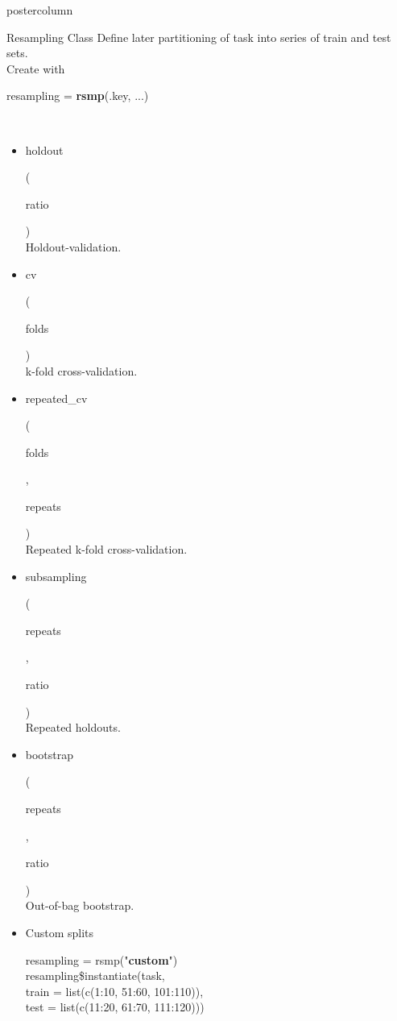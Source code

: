 \documentclass{beamer}
\newlength{\columnheight} %
\newcommand{\codeinline}[1]{\begin{codeboxinline}#1\end{codeboxinline}}
\begin{document}
\begin{withoutheader}
\begin{frame}[fragile]{}
	\begin{columns}
		\begin{column}{.245\textwidth}
			\begin{beamercolorbox}[center]{postercolumn}
				\begin{minipage}{.98\textwidth}
					\parbox[t][\columnheight]{\textwidth}{
							\begin{myblock}{Resampling Class}
							Define later partitioning of task into series of train and test sets. \\ 
							Create with \codeinline{resampling = \textbf{rsmp}(.key, ...)}
							\\
							\begin{itemize}
                                \item \codeinline{holdout}
                                (\codeinline{ratio})\\
                                Holdout-validation.
								\item \codeinline{cv}
								(\codeinline{folds})\\
								k-fold cross-validation.
								\item \codeinline{repeated\_cv}
								(\codeinline{folds}, \codeinline{repeats})\\
								Repeated k-fold cross-validation.
								\item \codeinline{subsampling}
								(\codeinline{repeats}, \codeinline{ratio})\\
								Repeated holdouts.
								\item \codeinline{bootstrap}
								(\codeinline{repeats}, \codeinline{ratio})\\
								Out-of-bag bootstrap.
								\item Custom splits \\
							\begin{codeboxmultiline}[width=26cm]
							resampling = rsmp("\textbf{custom}")\\
							resampling\$instantiate(task,\\
							\hspace*{1ex} train = list(c(1:10, 51:60, 101:110)),\\
							\hspace*{1ex} test = list(c(11:20, 61:70, 111:120)))
							\end{codeboxmultiline}
							\end{itemize}

\end{myblock}}
\end{minipage}
\end{beamercolorbox}
\end{column}
\end{columns}
\end{frame}
\end{withoutheader}
\end{document}
